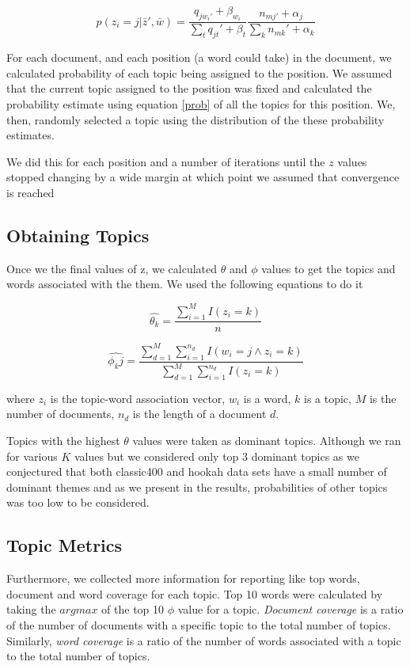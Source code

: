 \documentclass[11pt,a4paper,oneside]{article}
\begin{document}
\begin{equation}
p(z_i = j | \bar{z}', \bar{w}) = \frac{q_{j w_{i}'} + \beta_{w_i}}{\sum_t{q_{jt}' + \beta_t}}\frac{n_{mj'} + \alpha_j}{\sum_k{n_{mk}' + \alpha_k}}
\end{equation}

For each document, and each position (a word could take) in the document, we calculated probability of each topic being assigned to the position. We assumed that the current topic assigned to the position was fixed and calculated the probability estimate using equation \ref{prob} of all the topics for this position. We, then, randomly selected a topic using the distribution of the these probability estimates.

We did this for each position and a number of iterations until the $z$ values stopped changing by a wide margin at which point we assumed that convergence is reached

\subsection{Obtaining Topics}
Once we the final values of z, we calculated $\theta$ and $\phi$ values to get the topics and words associated with the them. We used the following equations \cite{classNotes} to do it

\begin{equation}
\hat{\theta_k} = \frac{\sum^M_{i=1}{I(z_i=k)}}{n}
\end{equation}

\begin{equation}
\hat{\phi_kj} = \frac{\sum^M_{d=1}{\sum^{n_d}_{i=1}{I(w_i=j \land z_i = k)}}}{\sum^M_{d=1}{\sum^{n_d}_{i=1}{I(z_i = k)}}}
\end{equation}

where $z_i$ is the topic-word association vector, $w_i$ is  a word, $k$ is a topic, $M$ is the number of documents, $n_d$ is the length of a document $d$.

Topics with the highest $\theta$ values were taken as dominant topics. Although we ran for various $K$ values but we considered only top 3 dominant topics as we conjectured that both classic400 and hookah data sets have a small number of dominant themes and as we present in the results, probabilities of other topics was too low to be considered.

\subsection{Topic Metrics}
Furthermore, we collected more information for reporting like top words, document and word coverage for each topic. Top 10 words were calculated by taking the $argmax$ of the top 10 $\phi$ value for a topic. \textit{Document coverage} is a ratio of the number of documents with a specific topic to the total number of topics. Similarly, \textit{word coverage} is a ratio of the number of words associated with a topic to the total number of topics.
\end{document}
